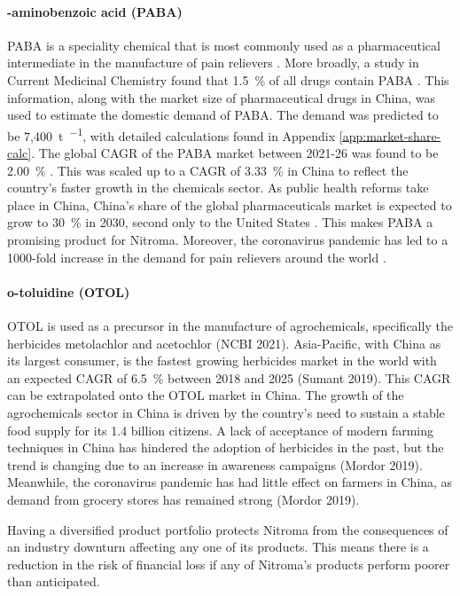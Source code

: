 \paragraph{\para-aminobenzoic acid (PABA)}
PABA is a speciality chemical that is most commonly used as a pharmaceutical intermediate in the manufacture of pain relievers \cite{pubchem_compound_2021}. More broadly, a study in Current Medicinal Chemistry found that \SI{1.5}{\percent} of all drugs contain PABA \cite{kluczyk_drug_2002}. This information, along with the market size of pharmaceutical drugs in China, was used to estimate the domestic demand of PABA. The demand was predicted to be 7,\SI{400}{\tonne\per\year}, with detailed calculations found in Appendix \ref{app:market-share-calc}. The global CAGR of the PABA market between 2021-26 was found to be \SI{2.00}{\percent} \cite{wboc_global_2021}. This was scaled up to a CAGR of \SI{3.33}{\percent} in China to reflect the country’s faster growth in the chemicals sector. As public health reforms take place in China, China’s share of the global pharmaceuticals market is expected to grow to \SI{30}{\percent} in 2030, second only to the United States \cite{allison_chinas_2021}. This makes PABA a promising product for Nitroma. Moreover, the coronavirus pandemic has led to a 1000-fold increase in the demand for pain relievers around the world \cit.

\paragraph{o-toluidine (OTOL)}
OTOL is used as a precursor in the manufacture of agrochemicals, specifically the herbicides metolachlor and acetochlor (NCBI 2021). Asia-Pacific, with China as its largest consumer, is the fastest growing herbicides market in the world with an expected CAGR of \SI{6.5}{\percent} between 2018 and 2025 (Sumant 2019). This CAGR can be extrapolated onto the OTOL market in China. The growth of the agrochemicals sector in China is driven by the country’s need to sustain a stable food supply for its 1.4 billion citizens. A lack of acceptance of modern farming techniques in China has hindered the adoption of herbicides in the past, but the trend is changing due to an increase in awareness campaigns (Mordor 2019). Meanwhile, the coronavirus pandemic has had little effect on farmers in China, as demand from grocery stores has remained strong (Mordor 2019).

Having a diversified product portfolio protects Nitroma from the consequences of an industry downturn affecting any one of its products. This means there is a reduction in the risk of financial loss if any of Nitroma's products perform poorer than anticipated.

